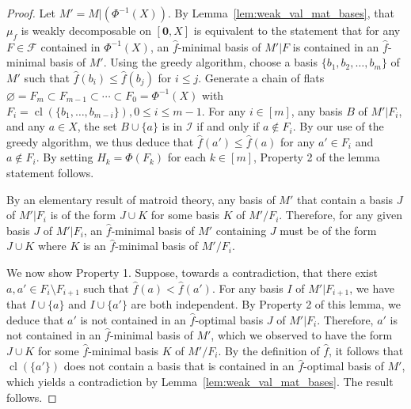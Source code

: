 \documentclass[a4paper,11pt,reqno]{article}
\theoremstyle{definition}
\newcommand{\zero}{{\mathbf{0}}}
\DeclareMathOperator{\cl}{cl}
\begin{document}
\begin{proof}
    Let $M'=M|(\Phi^{-1}(X))$. By Lemma~\ref{lem:weak_val_mat_bases}, that $\mu_f$ is weakly decomposable on $[\zero, X]$ is equivalent to the statement that for any $F\in\mathcal{F}$ contained in $\Phi^{-1}(X)$, an $\hat{f}$-minimal basis of $M'|F$ is contained in an $\hat{f}$-minimal basis of $M'$. Using the greedy algorithm, choose a basis $\{b_1,b_2,\dots,b_m\}$ of $M'$ such that $\hat{f}(b_i)\leq\hat{f}(b_{j})$ for $i\leq j$. Generate a chain of flats $\varnothing=F_m\subset F_{m-1}\subset\cdots\subset F_0=\Phi^{-1}(X)$ with $F_i=\cl(\{b_1,\dots,b_{m-i}\}), 0\leq i\leq m-1$. For any $i\in[m]$, any basis $B$ of $M'|F_i$, and any $a\in X$, the set $B\cup\{a\}$ is in $\mathcal{I}$ if and only if $a\notin F_i$. By our use of the greedy algorithm, we thus deduce that $\hat{f}(a')\leq\hat{f}(a)$ for any $a'\in F_i$ and $a\notin F_i$. By setting $H_k=\Phi(F_k)$ for each $k\in[m]$, Property 2 of the lemma statement follows.

    By an elementary result of matroid theory, any basis of $M'$ that contain a basis $J$ of $M'|F_i$ is of the form $J\cup K$ for some basis $K$ of $M'/F_i$. Therefore, for any given basis $J$ of $M'|F_i$, an $\hat{f}$-minimal basis of $M'$ containing $J$ must be of the form $J\cup K$ where $K$ is an $\hat{f}$-minimal basis of $M'/F_i$.
    
    We now show Property 1. Suppose, towards a contradiction, that there exist $a,a'\in F_i\setminus F_{i+1}$ such that $\hat{f}(a)<\hat{f}(a')$. For any basis $I$ of $M'|F_{i+1}$, we have that $I\cup \{a\}$ and $I\cup \{a'\}$ are both independent. By Property 2 of this lemma, we deduce that $a'$ is not contained in an $\hat{f}$-optimal basis $J$ of $M'|F_i$. Therefore, $a'$ is not contained in an $\hat{f}$-minimal basis of $M'$, which we observed to have the form $J\cup K$ for some $\hat{f}$-minimal basis $K$ of $M'/F_i$. By the definition of $\hat{f}$, it follows that $\cl(\{a'\})$ does not contain a basis that is contained in an $\hat{f}$-optimal basis of $M'$, which yields a contradiction by Lemma~\ref{lem:weak_val_mat_bases}. The result follows.
\end{proof}
\end{document}

